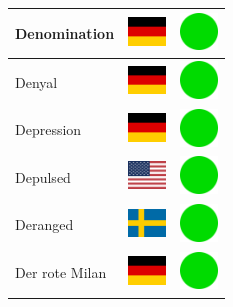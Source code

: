 \documentclass[12pt, a4paper, twoside]{report}
\begin{document}
\begin{center}
\begin{longtable}{|p{5cm}|p{2cm}|p{2cm}|}
 Denomination                                               & \includegraphics[width=1cm]{../img/flags/de} &   \includegraphics[width=1cm]{../likes/y} \\ \hline
 Denyal                                                     & \includegraphics[width=1cm]{../img/flags/de} &   \includegraphics[width=1cm]{../likes/y} \\ \hline
 Depression                                                 & \includegraphics[width=1cm]{../img/flags/de} &   \includegraphics[width=1cm]{../likes/y} \\ \hline
 Depulsed                                                   & \includegraphics[width=1cm]{../img/flags/us} &   \includegraphics[width=1cm]{../likes/y} \\ \hline
 Deranged                                                   & \includegraphics[width=1cm]{../img/flags/se} &   \includegraphics[width=1cm]{../likes/y} \\ \hline
 Der rote Milan                                             & \includegraphics[width=1cm]{../img/flags/de} &   \includegraphics[width=1cm]{../likes/y} \\ \hline

\end{longtable}
\end{center}
\end{document}
